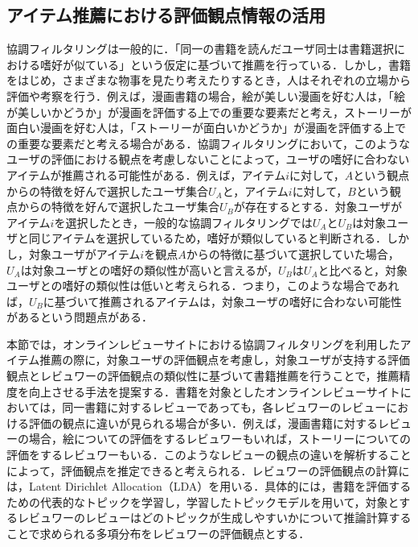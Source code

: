 \documentclass[a4paper,11pt,oneside,openany]{jsbook}
\begin{document}
\subsection{アイテム推薦における評価観点情報の活用}
協調フィルタリングは一般的に．「同一の書籍を読んだユーザ同士は書籍選択における嗜好が似ている」という仮定に基づいて推薦を行っている．しかし，書籍をはじめ，さまざまな物事を見たり考えたりするとき，人はそれぞれの立場から評価や考察を行う．例えば，漫画書籍の場合，絵が美しい漫画を好む人は，「絵が美しいかどうか」が漫画を評価する上での重要な要素だと考え，ストーリーが面白い漫画を好む人は，「ストーリーが面白いかどうか」が漫画を評価する上での重要な要素だと考える場合がある．協調フィルタリングにおいて，このようなユーザの評価における観点を考慮しないことによって，ユーザの嗜好に合わないアイテムが推薦される可能性がある．例えば，アイテム$i$に対して，$A$という観点からの特徴を好んで選択したユーザ集合$U_A$と，アイテム$i$に対して，$B$という観点からの特徴を好んで選択したユーザ集合$U_B$が存在するとする．対象ユーザがアイテム$i$を選択したとき，一般的な協調フィルタリングでは$U_A$と$U_B$は対象ユーザと同じアイテムを選択しているため，嗜好が類似していると判断される．しかし，対象ユーザがアイテム$i$を観点$A$からの特徴に基づいて選択していた場合，$U_A$は対象ユーザとの嗜好の類似性が高いと言えるが，$U_B$は$U_A$と比べると，対象ユーザとの嗜好の類似性は低いと考えられる．つまり，このような場合であれば，$U_B$に基づいて推薦されるアイテムは，対象ユーザの嗜好に合わない可能性があるという問題点がある．
\par
本節では，オンラインレビューサイトにおける協調フィルタリングを利用したアイテム推薦の際に，対象ユーザの評価観点を考慮し，対象ユーザが支持する評価観点とレビュワーの評価観点の類似性に基づいて書籍推薦を行うことで，推薦精度を向上させる手法を提案する．書籍を対象としたオンラインレビューサイトにおいては，同一書籍に対するレビューであっても，各レビュワーのレビューにおける評価の観点に違いが見られる場合が多い．例えば，漫画書籍に対するレビューの場合，絵についての評価をするレビュワーもいれば，ストーリーについての評価をするレビュワーもいる．このようなレビューの観点の違いを解析することによって，評価観点を推定できると考えられる．レビュワーの評価観点の計算には，Latent Dirichlet Allocation（LDA）\cite{Blei}を用いる．具体的には，書籍を評価するための代表的なトピックを学習し，学習したトピックモデルを用いて，対象とするレビュワーのレビューはどのトピックが生成しやすいかについて推論計算することで求められる多項分布をレビュワーの評価観点とする．
\end{document}
